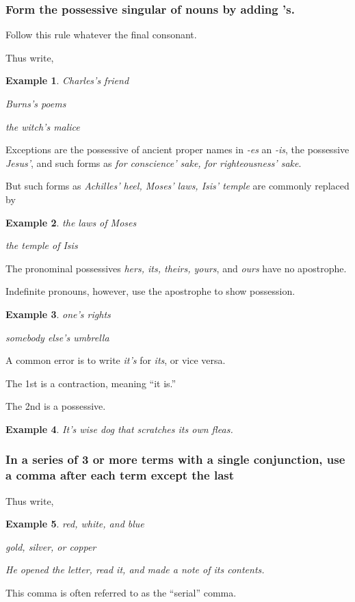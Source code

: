 \documentclass{article}
\newtheorem{example}{Example}
\begin{document}
\subsubsection{Form the possessive singular of nouns by adding 's.}
Follow this rule whatever the final consonant.

Thus write,
\begin{example}
	Charles's friend
	
	Burns's poems
	
	the witch's malice
\end{example}
Exceptions are the possessive of ancient proper names in {\it -es} an {\it -is}, the possessive {\it Jesus'}, and such forms as {\it for conscience' sake, for righteousness' sake}.

But such forms as {\it Achilles' heel, Moses' laws, Isis' temple} are commonly replaced by
\begin{example}
	the laws of Moses
	
	the temple of Isis
\end{example}
The pronominal possessives {\it hers, its, theirs, yours}, and {\it ours} have no apostrophe.

Indefinite pronouns, however, use the apostrophe to show possession.
\begin{example}
	one's rights
	
	somebody else's umbrella
\end{example}
A common error is to write {\it it's} for {\it its}, or vice versa.

The 1st is a contraction, meaning ``it is.''

The 2nd is a possessive.
\begin{example}
	It's wise dog that scratches its own fleas.
\end{example}


\subsubsection{In a series of 3 or more terms with a single conjunction, use a comma after each term except the last}
Thus write,
\begin{example}
	red, white, and blue
	
	gold, silver, or copper
	
	He opened the letter, read it, and made a note of its contents.
\end{example}
This comma is often referred to as the ``serial'' comma.
\end{document}
